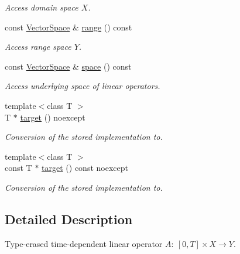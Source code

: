 \begin{DoxyCompactItemize}
\begin{DoxyCompactList}\small\item\em Access domain space $X$. \end{DoxyCompactList}\item 
const \hyperlink{classSpacy_1_1VectorSpace}{Vector\+Space} \& \hyperlink{classSpacy_1_1DynamicLinearOperator_a08e5f8bd41f1112ae349e50dd773b9ea}{range} () const \hypertarget{classSpacy_1_1DynamicLinearOperator_a08e5f8bd41f1112ae349e50dd773b9ea}{}\label{classSpacy_1_1DynamicLinearOperator_a08e5f8bd41f1112ae349e50dd773b9ea}

\begin{DoxyCompactList}\small\item\em Access range space $Y$. \end{DoxyCompactList}\item 
const \hyperlink{classSpacy_1_1VectorSpace}{Vector\+Space} \& \hyperlink{classSpacy_1_1DynamicLinearOperator_afde64039ceab0ad8752bce3ac2187a41}{space} () const \hypertarget{classSpacy_1_1DynamicLinearOperator_afde64039ceab0ad8752bce3ac2187a41}{}\label{classSpacy_1_1DynamicLinearOperator_afde64039ceab0ad8752bce3ac2187a41}

\begin{DoxyCompactList}\small\item\em Access underlying space of linear operators. \end{DoxyCompactList}\item 
{\footnotesize template$<$class T $>$ }\\T $\ast$ \hyperlink{classSpacy_1_1DynamicLinearOperator_a5574c61e31ef28d9d1660dd69fc31810}{target} () noexcept
\begin{DoxyCompactList}\small\item\em Conversion of the stored implementation to. \end{DoxyCompactList}\item 
{\footnotesize template$<$class T $>$ }\\const T $\ast$ \hyperlink{classSpacy_1_1DynamicLinearOperator_a1bb194c6f220a136916f661314f543ae}{target} () const noexcept
\begin{DoxyCompactList}\small\item\em Conversion of the stored implementation to. \end{DoxyCompactList}\end{DoxyCompactItemize}


\subsection{Detailed Description}
Type-\/erased time-\/dependent linear operator $A:\ [0,T] \times X \to Y $. 

